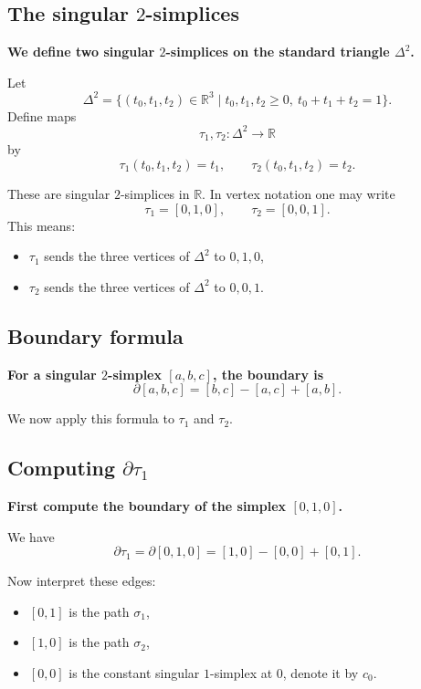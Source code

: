 \documentclass[12pt,a4paper]{article}
\theoremstyle{notespace}
\begin{document}
\subsection{The singular \(2\)-simplices}

\textbf{We define two singular \(2\)-simplices on the standard triangle \(\Delta^2\).}

Let
\[
\Delta^2=\{(t_0,t_1,t_2)\in \mathbb{R}^3 \mid t_0,t_1,t_2\ge 0,\ t_0+t_1+t_2=1\}.
\]
Define maps
\[
\tau_1,\tau_2:\Delta^2\to \mathbb{R}
\]
by
\[
\tau_1(t_0,t_1,t_2)=t_1,
\qquad
\tau_2(t_0,t_1,t_2)=t_2.
\]

These are singular \(2\)-simplices in \(\mathbb{R}\). In vertex notation one may write
\[
\tau_1=[0,1,0],
\qquad
\tau_2=[0,0,1].
\]
This means:

\begin{itemize}
	\item \(\tau_1\) sends the three vertices of \(\Delta^2\) to \(0,1,0\),
	\item \(\tau_2\) sends the three vertices of \(\Delta^2\) to \(0,0,1\).
\end{itemize}

\subsection{Boundary formula}

\textbf{For a singular \(2\)-simplex \([a,b,c]\), the boundary is}
\[
\partial[a,b,c]=[b,c]-[a,c]+[a,b].
\]

We now apply this formula to \(\tau_1\) and \(\tau_2\).

\subsection{Computing \(\partial \tau_1\)}

\textbf{First compute the boundary of the simplex \([0,1,0]\).}

We have
\[
\partial\tau_1
=
\partial[0,1,0]
=
[1,0]-[0,0]+[0,1].
\]

Now interpret these edges:

\begin{itemize}
	\item \([0,1]\) is the path \(\sigma_1\),
	\item \([1,0]\) is the path \(\sigma_2\),
	\item \([0,0]\) is the constant singular \(1\)-simplex at \(0\), denote it by \(c_0\).
\end{itemize}
\end{document}
